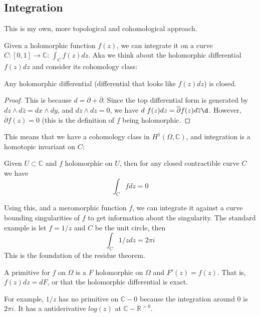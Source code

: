 \documentclass[main.tex]{subfiles}
\begin{document}
\subsection{Integration}
\begin{remark}
This is my own, more topological and cohomological approach.
\end{remark}
Given a holomorphic function $f(z)$, we can integrate it on a curve $C: [0,1] \rightarrow \mathbb{C}$: $\int_C f(z) dz$. Aka we think about the holomorphic differential $f(z) dz$ and consider its cohomology class:

\begin{lemma}
Any holomorphic differential (differential that looks like $f(z) dz$) is closed. 
\end{lemma}

\begin{proof}
This is because $d = \partial + \overline{\partial}$. Since the top differential form is generated by $dz \wedge d\overline{z} = dx \wedge dy$, and $dz \wedge dz = 0$, we have $d \ f(z) dz = \overline{\partial} f(z) d\overline{z} \d$. However, $\overline{\partial} f(z) = 0$ (this is the definition of $f$ being holomorphic. 
\end{proof}

This means that we have a cohomology class in $H^1(\Omega, \mathbb{C})$, and integration is a homotopic invariant on $C$:

\begin{corollary}
Given $U \subset \mathbb{C}$ and $f$ holomorphic on $U$, then for any closed contractible curve $C$ we have 
$$
\int_C f dz = 0
$$
\end{corollary}

Using this, and a meromorphic function $f$, we can integrate it against a curve bounding singularities of $f$ to get information about the singularity. The standard example is let $f = 1/z$ and $C$ be the unit circle, then 
$$
\int_C 1/z dz = 2\pi i
$$
This is the foundation of the residue theorem. 

\begin{definition}

A primitive for $f$ on $\Omega$ is a $F$ holomorphic on $\Omega$ and $F'(z) = f(z)$. 
That is, $f(z) dz = dF$, or that the holomorphic differential is exact. 
\end{definition}

For example, $1/z$ has no primitive on $\mathbb{C}-0$ because the integration around $0$ is $2\pi i$. It has a antiderivative $log(z)$ at $\mathbb{C} - \mathbb{R}^{>0}$.
\end{document}
